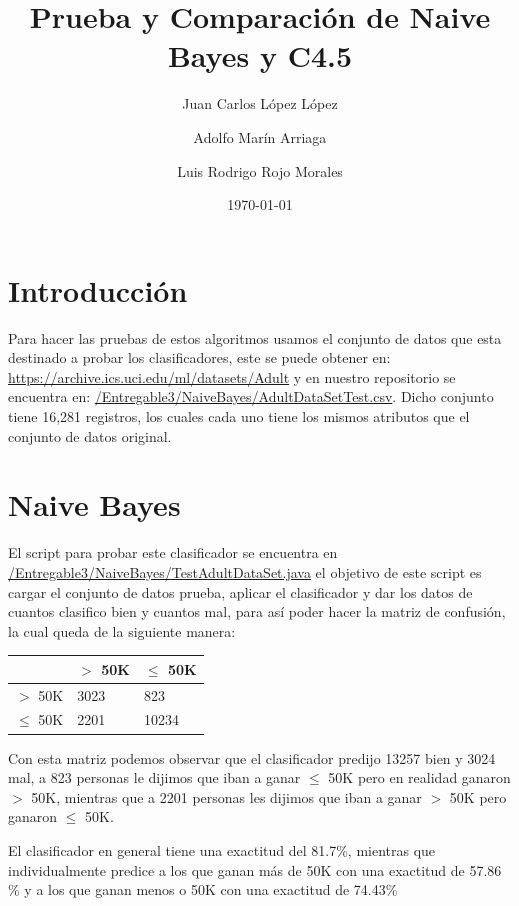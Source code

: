 \documentclass{article}
\title{Prueba y Comparación de Naive Bayes y C4.5}
\author{Juan Carlos López López \and Adolfo Marín Arriaga \and Luis Rodrigo Rojo Morales}
\date{\today\\}
\begin{document}
 \maketitle
 \section{Introducción}
 Para hacer las pruebas de estos algoritmos usamos el conjunto de datos que esta destinado a probar los clasificadores, este se puede obtener en: \href{https://archive.ics.uci.edu/ml/datasets/Adult} {https://archive.ics.uci.edu/ml/datasets/Adult} y en nuestro repositorio se encuentra en: \href{https://github.com/rodrigorojo/ProyectoFinalMineria/blob/master/Entregable3/NaiveBayes/AdultDataSetTest.csv}{/Entregable3/NaiveBayes/AdultDataSetTest.csv}. Dicho conjunto tiene 16,281 registros, los cuales cada uno tiene los mismos atributos que el conjunto de datos original.

 \section{Naive Bayes}
 El script para probar este clasificador se encuentra en \href{https://github.com/rodrigorojo/ProyectoFinalMineria/blob/master/Entregable3/NaiveBayes/TestAdultDataSet.java} {/Entregable3/NaiveBayes/TestAdultDataSet.java} el objetivo de este script es cargar el conjunto de datos prueba, aplicar el clasificador y dar los datos de cuantos clasifico bien y cuantos mal, para así poder hacer la matriz de confusión, la cual queda de la siguiente manera:
 \begin{center}
   \begin{tabular}{|p{2cm}|p{2cm}|p{2cm}|}
     \hline
                  & $>$ 50K & $\leq$ 50K  \\ \hline
      $>$ 50K     & 3023 & 823 \\ \hline
      $\leq$ 50K  & 2201 & 10234 \\ \hline
    \end{tabular}
 \end{center}
 Con esta matriz podemos observar que el clasificador predijo 13257 bien y 3024 mal, a 823 personas le dijimos que iban a ganar $\leq$ 50K pero en realidad ganaron $>$ 50K, mientras que a 2201 personas les dijimos que iban a ganar $>$ 50K pero ganaron $\leq$ 50K.

 El clasificador en general tiene una exactitud del 81.7$\%$, mientras que individualmente predice a los que ganan más de 50K con una exactitud de 57.86$\%$ y a los que ganan menos o 50K con una exactitud de 74.43$\%$
\end{document}
